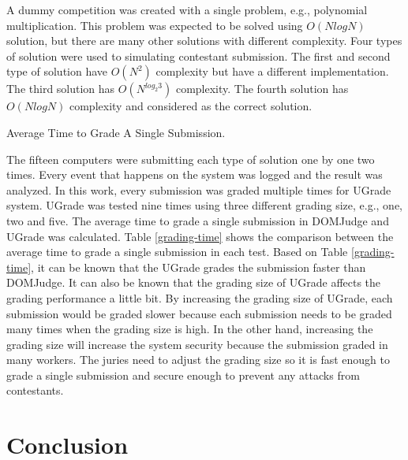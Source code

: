 \documentclass[conference,a4paper]{IEEEtran}
\begin{document}
A dummy competition was created with a single problem, e.g., polynomial multiplication. This problem was expected to be solved using $O(N log N)$ solution, but there are many other solutions with different complexity. Four types of solution were used to simulating contestant submission. The first and second type of solution have $O(N^2)$ complexity but have a different implementation. The third solution has $O(N^{log_2{3}})$ complexity. The fourth solution has $O(N log N)$ complexity and considered as the correct solution.

\begin{table}[ht!]
    \label{grading-time}
    \caption{Average Time to Grade A Single Submission.}
    \begin{center}
        
    \end{center}
\end{table}

The fifteen computers were submitting each type of solution one by one two times. Every event that happens on the system was logged and the result was analyzed. In this work, every submission was graded multiple times for UGrade system. UGrade was tested nine times using three different grading size, e.g., one, two and five. The average time to grade a single submission in DOMJudge and UGrade was calculated. Table \ref{grading-time} shows the comparison between the average time to grade a single submission in each test. Based on Table \ref{grading-time}, it can be known that the UGrade grades the submission faster than DOMJudge. It can also be known that the grading size of UGrade affects the grading performance a little bit. By increasing the grading size of UGrade, each submission would be graded slower because each submission needs to be graded many times when the grading size is high. In the other hand, increasing the grading size will increase the system security because the submission graded in many workers. The juries need to adjust the grading size so it is fast enough to grade a single submission and secure enough to prevent any attacks from contestants.

\section{Conclusion}
\end{document}
